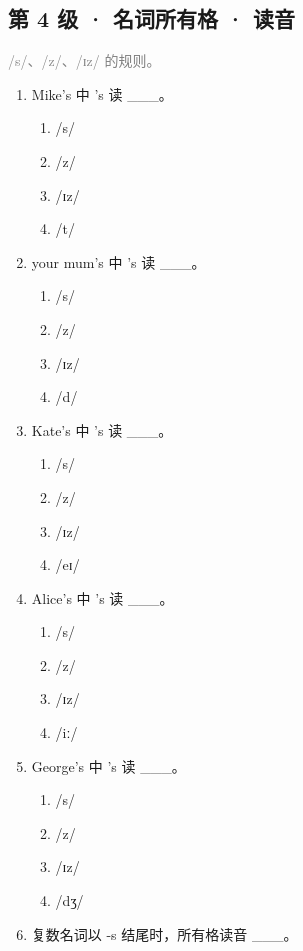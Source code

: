 \documentclass[11pt,a4paper]{ctexart}
\begin{document}
\subsection*{第 4 级 · 名词所有格 · 读音}
\noindent\textcolor{gray}{/s/、/z/、/ɪz/ 的规则。}\par\smallskip
\begin{enumerate}[leftmargin=*,itemsep=4pt]
\item Mike’s 中 ’s 读 \_\_\_。
\begin{enumerate}[label=\Alph*.,leftmargin=2em,itemsep=1pt,topsep=2pt]
\item /s/
\item /z/
\item /ɪz/
\item /t/
\end{enumerate}
\item your mum’s 中 ’s 读 \_\_\_。
\begin{enumerate}[label=\Alph*.,leftmargin=2em,itemsep=1pt,topsep=2pt]
\item /s/
\item /z/
\item /ɪz/
\item /d/
\end{enumerate}
\item Kate’s 中 ’s 读 \_\_\_。
\begin{enumerate}[label=\Alph*.,leftmargin=2em,itemsep=1pt,topsep=2pt]
\item /s/
\item /z/
\item /ɪz/
\item /eɪ/
\end{enumerate}
\item Alice’s 中 ’s 读 \_\_\_。
\begin{enumerate}[label=\Alph*.,leftmargin=2em,itemsep=1pt,topsep=2pt]
\item /s/
\item /z/
\item /ɪz/
\item /iː/
\end{enumerate}
\item George’s 中 ’s 读 \_\_\_。
\begin{enumerate}[label=\Alph*.,leftmargin=2em,itemsep=1pt,topsep=2pt]
\item /s/
\item /z/
\item /ɪz/
\item /dʒ/
\end{enumerate}
\item 复数名词以 -s 结尾时，所有格读音 \_\_\_。

\end{enumerate}
\end{document}
